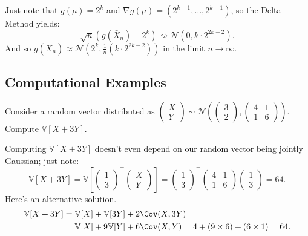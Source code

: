 \begin{solution}
    Just note that $g(\mu) = 2^k$ and $\nabla g(\mu) = (2^{k - 1}, \dots, 2^{k - 1})$,
    so the Delta Method yields:
    \[ \sqrt{n}\left(g(\bar{X}_n) - 2^k\right) \rightsquigarrow
    \mathcal{N}(0, k \cdot 2^{2k - 2}). \]
    And so $g(\bar{X}_n) \approx
    \mathcal{N}\left(2^k, \frac{1}{n}(k \cdot 2^{2k - 2}) \right)$ in the limit $n \to \infty$.
\end{solution}

\subsection{Computational Examples}

\begin{problem}
    Consider a random vector distributed as
    $\begin{pmatrix} X \\ Y \end{pmatrix} \sim
    \mathcal{N}\left(\begin{pmatrix} 3 \\ 2 \end{pmatrix},
    \begin{pmatrix} 4 & 1 \\ 1 & 6 \end{pmatrix}\right)$.
    Compute $\mathbb{V}[X + 3Y]$.
\end{problem}

\begin{solution}
    Computing $\mathbb{V}[X + 3Y]$ doesn't even depend on
    our random vector being jointly Gaussian; just note:
    \[
    \mathbb{V}[X + 3Y] =
    \mathbb{V}\left[\begin{pmatrix} 1 \\ 3 \end{pmatrix}^{\top}
    \begin{pmatrix} X \\ Y \end{pmatrix}\right] =
    \begin{pmatrix} 1 \\ 3 \end{pmatrix}^{\top}
    \begin{pmatrix} 4 & 1 \\ 1 & 6 \end{pmatrix}
    \begin{pmatrix} 1 \\ 3 \end{pmatrix} = 64.
    \]
    Here's an alternative solution.
    \begin{align*}
        \mathbb{V}[X + 3Y]
        & = \mathbb{V}[X] + \mathbb{V}[3Y] + 2 \Cov(X, 3Y) \\
        & = \mathbb{V}[X] + 9 \mathbb{V}[Y] + 6 \Cov(X, Y)
        = 4 + (9 \times 6) + (6 \times 1) = 64.
    \end{align*}
\end{solution}

